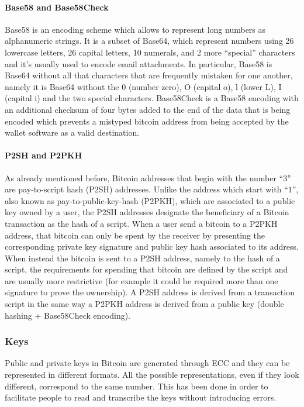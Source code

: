 \paragraph{Base58 and Base58Check} Base58 is an encoding scheme which allows to
represent long numbers as alphanumeric strings. It is a subset of Base64, which
represent numbers using 26 lowercase letters, 26 capital letters, 10 numerals,
and 2 more ``special'' characters and it's usually used to encode email
attachments. In particular, Base58 is Base64 without all that characters that
are frequently mistaken for one another, namely it is Base64 without the 0
(number zero), O (capital o), l (lower L), I (capital i) and the two special
characters. Base58Check is a Base58 encoding with an additional checksum of four
bytes added to the end of the data that is being encoded which prevents a
mistyped bitcoin address from being accepted by the wallet software as a valid
destination.


\paragraph{P2SH and P2PKH}  As already mentioned before, Bitcoin addresses that
begin with the number ``$3$'' are pay-to-script hash (P2SH) addresses. Unlike
the address which start with ``$1$'', also known as pay-to-public-key-hash
(P2PKH), which are associated to a public key owned by a user, the P2SH
addresses designate the beneficiary of a Bitcoin transaction as the hash of a
script. When a user send a bitcoin to a P2PKH address, that bitcoin can only
be spent by the receiver by presenting the corresponding private key signature
and public key hash associated to its address. When instead the bitcoin is sent to
a P2SH address, namely to the hash of a script, the requirements for spending that
bitcoin are defined by the script and are usually more restrictive (for example it
could be required more than one signature to prove the ownership). A P2SH address
is derived from a transaction script in the same way a P2PKH address is derived
from a public key (double hashing + Base58Check encoding).


\subsubsection{Keys}
Public and private keys in Bitcoin are generated through ECC and they can be
represented in different formats. All the possible representations, even if they
look different, correspond to the same number. This has been done in order to
facilitate people to read and transcribe the keys without introducing errors.

